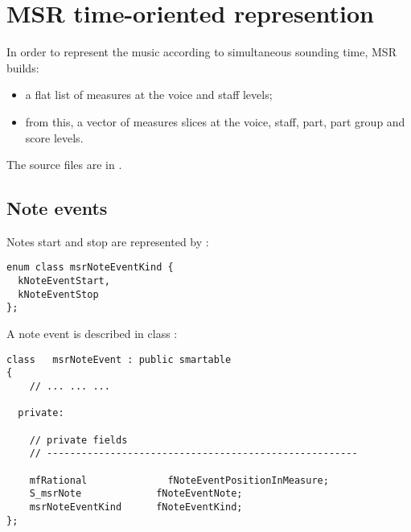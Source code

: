 



\chapter{MSR time-oriented represention}\label{MSR time-oriented represention}

In order to represent the music according to simultaneous sounding time, MSR builds:
\begin{itemize}
\item a flat list of measures at the voice and staff levels;
\item from this, a vector of measures slices at the voice, staff, part, part group and score levels.
\end{itemize}

The source files are in .


\section{Note events}

Notes start and stop are represented by :
\begin{lstlisting}[language=CPlusPlus]
enum class msrNoteEventKind {
  kNoteEventStart,
  kNoteEventStop
};
\end{lstlisting}

A note event is described in class   {\tt }:
\begin{lstlisting}[language=CPlusPlus]
class   msrNoteEvent : public smartable
{
	// ... ... ...

  private:

    // private fields
    // ------------------------------------------------------

    mfRational              fNoteEventPositionInMeasure;
    S_msrNote             fNoteEventNote;
    msrNoteEventKind      fNoteEventKind;
};
\end{lstlisting}


